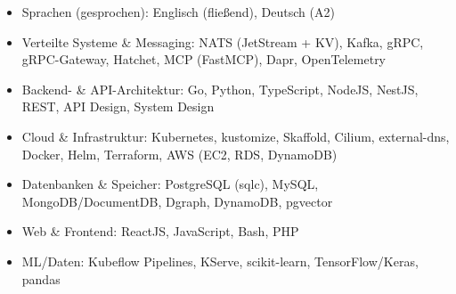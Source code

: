 \documentclass[10pt,a4paper]{resume}
\begin{document}
\begin{itemize}[leftmargin=1.4em,nosep,topsep=2pt]
  \item Sprachen (gesprochen): Englisch (fließend), Deutsch (A2)
  \item Verteilte Systeme \& Messaging: NATS (JetStream + KV), Kafka, gRPC, gRPC-Gateway, Hatchet, MCP (FastMCP), Dapr, OpenTelemetry
  \item Backend- \& API-Architektur: Go, Python, TypeScript, NodeJS, NestJS, REST, API Design, System Design
  \item Cloud \& Infrastruktur: Kubernetes, kustomize, Skaffold, Cilium, external-dns, Docker, Helm, Terraform, AWS (EC2, RDS, DynamoDB)
  \item Datenbanken \& Speicher: PostgreSQL (sqlc), MySQL, MongoDB/DocumentDB, Dgraph, DynamoDB, pgvector
  \item Web \& Frontend: ReactJS, JavaScript, Bash, PHP
  \item ML/Daten: Kubeflow Pipelines, KServe, scikit-learn, TensorFlow/Keras, pandas
\end{itemize}
\end{document}
